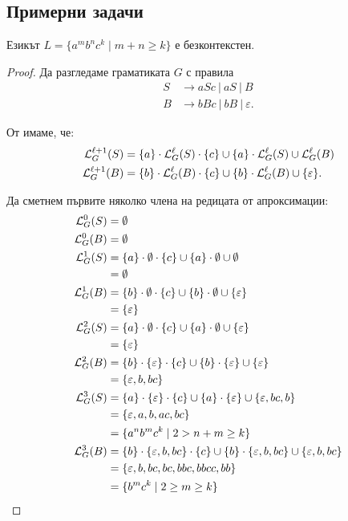 \subsection{Примерни задачи}

\begin{example}
  Езикът $L = \{a^mb^nc^k\mid m+n \geq k\}$ е безконтекстен.
\end{example}  
\begin{proof}
  Да разгледаме граматиката $G$ с правила
  \begin{align*}
    S& \rightarrow aSc\ |\ aS\ |\ B\\
    B& \rightarrow bBc\ |\  bB\ |\ \varepsilon.
  \end{align*}

  От  имаме, че:
  \begin{align*}
    \mathcal{L}^{\ell+1}_G(S) & = \{a\} \cdot \mathcal{L}^\ell_G(S) \cdot \{c\} \cup \{a\}\cdot \mathcal{L}^\ell_G(S) \cup \mathcal{L}^\ell_G(B)\\
    \mathcal{L}^{\ell+1}_G(B) & = \{b\} \cdot \mathcal{L}^\ell_G(B) \cdot \{c\} \cup \{b\} \cdot \mathcal{L}^\ell_G(B) \cup \{\varepsilon\}.
  \end{align*}

  Да сметнем първите няколко члена на редицата от апроксимации:
  \begin{align*}
    \mathcal{L}^0_G(S) & = \emptyset\\
    \mathcal{L}^0_G(B) & = \emptyset\\
    \mathcal{L}^1_G(S) & = \{a\} \cdot \emptyset \cdot \{c\} \cup \{a\}\cdot\emptyset \cup \emptyset \\
              & = \emptyset\\
    \mathcal{L}^1_G(B) & = \{b\} \cdot \emptyset \cdot \{c\} \cup \{b\} \cdot \emptyset \cup \{\varepsilon\} \\
              & = \{\varepsilon\}\\
    \mathcal{L}^2_G(S) & = \{a\} \cdot \emptyset \cdot \{c\} \cup \{a\}\cdot\emptyset \cup \{\varepsilon\} \\
              & = \{\varepsilon\}\\
    \mathcal{L}^2_G(B) & = \{b\} \cdot \{\varepsilon\} \cdot \{c\} \cup \{b\}\cdot \{\varepsilon\} \cup \{\varepsilon\} \\
              & = \{\varepsilon,b,bc\}\\
    \mathcal{L}^3_G(S) & = \{a\} \cdot \{\varepsilon\} \cdot \{c\} \cup \{a\}\cdot\{\varepsilon\} \cup \{\varepsilon,bc,b\} \\
              & = \{\varepsilon, a, b, ac, bc\}\\
              & = \{a^nb^mc^k \mid 2 > n+m \geq k\}\\
    \mathcal{L}^3_G(B) & = \{b\} \cdot \{\varepsilon,b,bc\} \cdot \{c\} \cup \{b\}\cdot \{\varepsilon,b,bc\} \cup \{\varepsilon,b,bc\} \\
              & = \{\varepsilon,b,bc,bc,bbc,bbcc,bb\}\\
              & = \{ b^mc^k \mid 2 \geq m \geq k\}
  \end{align*}


\end{proof}
